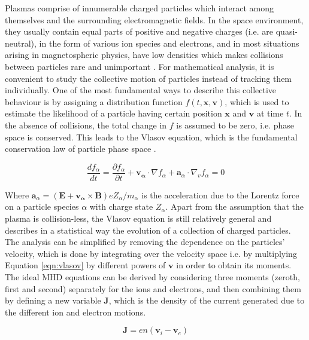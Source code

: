 Plasmas comprise of innumerable charged particles which interact among themselves and the surrounding electromagnetic fields. In the space environment, they usually contain equal parts of positive and negative charges (i.e. are quasi-neutral), in the form of various ion species and electrons, and in most situations arising in magnetospheric physics, have low densities which makes collisions between particles rare and unimportant \cite{Bruno2013TheLaboratory}. For mathematical analysis, it is convenient to study the collective motion of particles instead of tracking them individually. One of the most fundamental ways to describe this collective behaviour is by assigning a distribution function $f(t, \mathbf{x}, \mathbf{v})$, which is used to estimate the likelihood of a particle having certain position $\mathbf{x}$ and $\mathbf{v}$ at time $t$. In the absence of collisions, the total change in $f$ is assumed to be zero, i.e. phase space is conserved. This leads to the Vlasov equation, which is the fundamental conservation law of particle phase space \cite{Chen1995IntroductionPhysics,Gombosi1998PhysicsEnvironment}. 

\begin{equation}
    \frac{df_\alpha}{dt} = \frac{\partial f_\alpha}{\partial t} + \mathbf{v_\alpha}\cdot\nabla f_\alpha + \mathbf{a}_\alpha \cdot \nabla_v f_\alpha = 0
    \label{eqn:vlasov}
\end{equation}

Where $\mathbf{a}_\alpha = (\mathbf{E} + \mathbf{v_\alpha} \times \mathbf{B})e Z_\alpha/m_\alpha$ is the acceleration due to the Lorentz force on a particle species $\alpha$ with charge state $Z_\alpha$. Apart from the assumption that the plasma is collision-less, the Vlasov equation is still relatively general and describes in a statistical way the evolution of a collection of charged particles. The analysis can be simplified by removing the dependence on the particles' velocity, which is done by integrating over the velocity space i.e. by multiplying Equation \ref{eqn:vlasov} by different powers of $\mathbf{v}$ in order to obtain its moments. The ideal MHD equations can be derived by considering three moments (zeroth, first and second) separately for the ions and electrons, and then combining them by defining a new variable $\mathbf{J}$, which is the density of the current generated due to the different ion and electron motions. 

\begin{equation}
    \mathbf{J} = en \left( \mathbf{v}_i - \mathbf{v}_e\right)
\end{equation}
 

